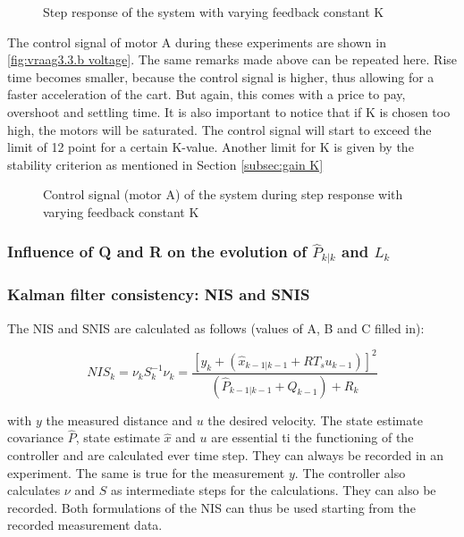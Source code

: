 \documentclass[a4paper]{article}
\newcommand{\newpar}{\vspace{.3cm}\noindent}
\begin{document}
\begin{figure}[H]
    \caption{Step response of the system with varying feedback constant K}
    \label{fig:vraag3.3.b}
\end{figure}

The control signal of motor A during these experiments are shown in \autoref{fig:vraag3.3.b voltage}. The same remarks made above can be repeated here. Rise time becomes smaller, because the control signal is higher, thus allowing for a faster acceleration of the cart. But again, this comes with a price to pay, overshoot and settling time. It is also important to notice that if K is chosen too high, the motors will be saturated. The control signal will start to exceed the limit of 12 point for a certain K-value. Another limit for K is given by the stability criterion as mentioned in Section \ref{subsec:gain K}

\begin{figure}[H]
    \caption{Control signal (motor A) of the system during step response with varying feedback constant K}
    \label{fig:vraag3.3.b voltage}
\end{figure}


\subsubsection{Influence of Q and R on the evolution of \(\hat{P}_{k|k}\) and \(L_{k}\)}

\subsubsection{Kalman filter consistency: NIS and SNIS}

The NIS and SNIS are calculated as follows (values of A, B and C filled in):

\begin{equation}
    NIS_{k}=\nu_{k} S_{k}^{-1} \nu_{k} = \frac{\left[y_{k}+\left( \hat{x}_{k-1|k-1}+R T_{s} u_{k-1}\right)\right]^{2}}{\left( \hat{P}_{k-1|k-1}+Q_{k-1}\right)+R_{k}}
    \label{eq:nis}
\end{equation}

\newpar
with \(y\) the measured distance and \(u\) the desired velocity. The state estimate covariance $\hat{P}$, state estimate $\hat{x}$ and $u$ are essential ti the functioning of the controller and are calculated ever time step. They can always be recorded in an experiment. The same is true for the measurement $y$. The controller also calculates $\nu$ and $S$ as intermediate steps for the calculations. They can also be recorded. Both formulations of the NIS can thus be used starting from the recorded measurement data.
\end{document}
